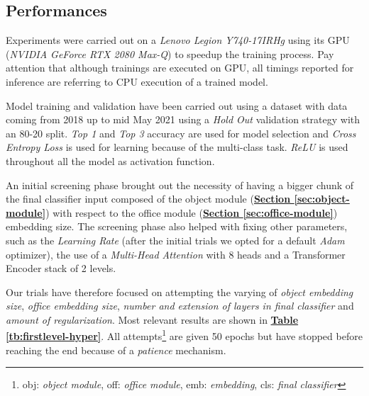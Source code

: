 \documentclass[12pt]{article}
\begin{document}
\subsection{Performances}\label{sec:1-lvl-perf}
Experiments were carried out on a \textit{Lenovo Legion Y740-17IRHg} using its GPU (\textit{NVIDIA GeForce RTX 2080 Max-Q}) to speedup the training process. Pay attention that although trainings are executed on GPU, all timings reported for inference are referring to CPU execution of a trained model. 

Model training and validation have been carried out using a dataset with data coming from 2018 up to mid May 2021 using a \textit{Hold Out} validation strategy with an 80-20 split. \textit{Top 1} and \textit{Top 3} accuracy are used for model selection and \textit{Cross Entropy Loss} is used for learning because of the multi-class task. \textit{ReLU} is used throughout all the model as activation function.

An initial screening phase brought out the necessity of having a bigger chunk of the final classifier input composed of the object module (\hyperref[sec:object-module]{\textbf{Section \ref{sec:object-module}}}) with respect to the office module (\hyperref[sec:office-module]{\textbf{Section \ref{sec:office-module}}}) embedding size. The screening phase also helped with fixing other parameters, such as the \textit{Learning Rate} (after the initial trials we opted for a default \textit{Adam} optimizer), the use of a \textit{Multi-Head Attention} with 8 heads and a Transformer Encoder stack of 2 levels.

Our trials have therefore focused on attempting the varying of \textit{object embedding size}, \textit{office embedding size}, \textit{number and extension of layers in final classifier} and \textit{amount of regularization}. Most relevant results are shown in \hyperref[tb:firstlevel-hyper]{\textbf{Table \ref{tb:firstlevel-hyper}}}. All attempts\footnote{obj: \textit{object module}, off: \textit{office module}, emb: \textit{embedding}, cls: \textit{final classifier}} are given 50 epochs but have stopped before reaching the end because of a \textit{patience} mechanism.
\end{document}
